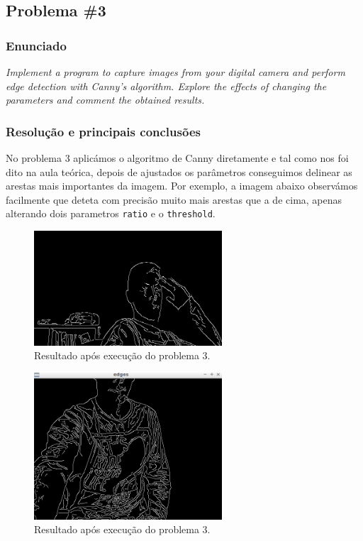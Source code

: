 \documentclass[portuguese, times, mirror]{revdetua}
\begin{document}




\subsection{Problema \#3}

\subsubsection{Enunciado}
\textit{ Implement a program to capture images from your digital camera and perform edge detection with
Canny’s algorithm. Explore the effects of changing the parameters and comment the obtained
results.}

\subsubsection{Resolução e principais conclusões}

No problema 3 aplicámos o algoritmo de Canny diretamente e tal como nos foi dito na aula teórica, depois de ajustados os parâmetros conseguimos delinear as arestas mais importantes da imagem. Por exemplo, a imagem abaixo observámos facilmente que deteta com precisão muito mais arestas que a de cima, apenas alterando dois parametros \texttt{ratio} e o \texttt{threshold}.


\begin{figure}[ht!]
\centering
\includegraphics[width=70mm]{img/ex3.png}
\caption{Resultado após execução do problema 3.}
\end{figure}

\begin{figure}[ht!]
\centering
\includegraphics[width=70mm]{img/ex3better.png}
\caption{Resultado após execução do problema 3.}
\end{figure}
\end{document}
